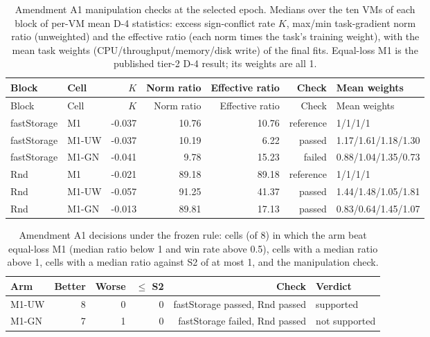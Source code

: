 \documentclass[a4paper,11pt]{article}
\begin{document}
\begin{longtable}{@{}llrrrrl@{}}
\caption{Amendment A1 manipulation checks at the selected epoch. Medians over the ten VMs of each block of per-VM mean D-4 statistics: excess sign-conflict rate $K$, max/min task-gradient norm ratio (unweighted) and the effective ratio (each norm times the task's training weight), with the mean task weights (CPU/throughput/memory/disk write) of the final fits. Equal-loss M1 is the published tier-2 D-4 result; its weights are all 1.}\label{tab:a1-manipulation}\\
\toprule
Block & Cell & $K$ & Norm ratio & Effective ratio & Check & Mean weights \\
\midrule
\endfirsthead
\toprule
Block & Cell & $K$ & Norm ratio & Effective ratio & Check & Mean weights \\
\midrule
\endhead
fastStorage & M1 & -0.037 & 10.76 & 10.76 & reference & 1/1/1/1 \\
fastStorage & M1-UW & -0.037 & 10.19 & 6.22 & passed & 1.17/1.61/1.18/1.30 \\
fastStorage & M1-GN & -0.041 & 9.78 & 15.23 & failed & 0.88/1.04/1.35/0.73 \\
Rnd & M1 & -0.021 & 89.18 & 89.18 & reference & 1/1/1/1 \\
Rnd & M1-UW & -0.057 & 91.25 & 41.37 & passed & 1.44/1.48/1.05/1.81 \\
Rnd & M1-GN & -0.013 & 89.81 & 17.13 & passed & 0.83/0.64/1.45/1.07 \\
\bottomrule
\end{longtable}

\begin{longtable}{@{}lrrrrl@{}}
\caption{Amendment A1 decisions under the frozen rule: cells (of 8) in which the arm beat equal-loss M1 (median ratio below 1 and win rate above 0.5), cells with a median ratio above 1, cells with a median ratio against S2 of at most 1, and the manipulation check.}\label{tab:a1-decision}\\
\toprule
Arm & Better & Worse & $\le$ S2 & Check & Verdict \\
\midrule
\endhead
M1-UW & 8 & 0 & 0 & fastStorage passed, Rnd passed & supported \\
M1-GN & 7 & 1 & 0 & fastStorage failed, Rnd passed & not supported \\
\bottomrule
\end{longtable}

\clearpage
\end{document}
